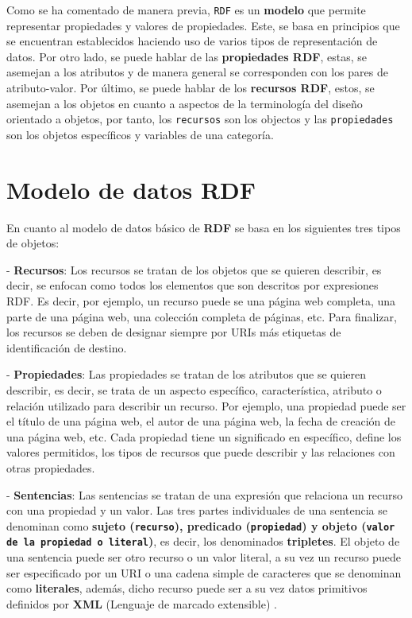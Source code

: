 \documentclass[11pt]{report}
\begin{document}
Como se ha comentado de manera previa, \texttt{RDF} es un \textbf{modelo} que permite representar propiedades y valores de propiedades. Este, se basa en principios que se encuentran establecidos haciendo uso de varios tipos de representación de datos. Por otro lado, se puede hablar de las \textbf{propiedades RDF}, estas, se asemejan a los atributos y de manera general se corresponden con los pares de atributo-valor. Por último, se puede hablar de los \textbf{recursos RDF}, estos, se asemejan a los objetos en cuanto a aspectos de la terminología del diseño orientado a objetos, por tanto, los \texttt{recursos} son los objectos y las \texttt{propiedades} son los objetos específicos y variables de una categoría.

\section{Modelo de datos RDF}

En cuanto al modelo de datos básico de \textbf{RDF} se basa en los siguientes tres tipos de objetos:

- \textbf{Recursos}: Los recursos se tratan de los objetos que se quieren describir, es decir, se enfocan como todos los elementos que son descritos por expresiones RDF. Es decir, por ejemplo, un recurso puede se una página web completa, una parte de una página web, una colección completa de páginas, etc. Para finalizar, los recursos se deben de designar siempre por URIs más etiquetas de identificación de destino.

- \textbf{Propiedades}: Las propiedades se tratan de los atributos que se quieren describir, es decir, se trata de un aspecto específico, característica, atributo o relación utilizado para describir un recurso. Por ejemplo, una propiedad puede ser el título de una página web, el autor de una página web, la fecha de creación de una página web, etc.  Cada propiedad tiene un significado en específico, define los valores permitidos, los tipos de recursos que puede describir y las relaciones con otras propiedades.

- \textbf{Sentencias}: Las sentencias se tratan de una expresión que relaciona un recurso con una propiedad y un valor. Las tres partes individuales de una sentencia se denominan como \textbf{sujeto (\texttt{recurso}), predicado (\texttt{propiedad}) y objeto (\texttt{valor de la propiedad o literal})}, es decir, los denominados \textbf{tripletes}. El objeto de una sentencia puede ser otro recurso o un valor literal, a su vez un recurso puede ser especificado por un URI o una cadena simple de caracteres que se denominan como \textbf{literales}, además, dicho recurso puede ser a su vez datos primitivos definidos por \textbf{XML} (Lenguaje de marcado extensible) \cite{6}.
\end{document}
